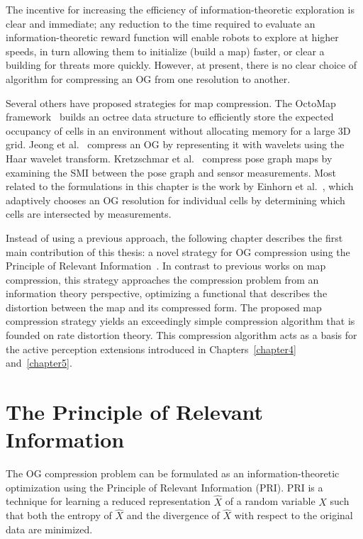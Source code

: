 The incentive for increasing the efficiency of information-theoretic exploration
is clear and immediate; any reduction to the time required to evaluate an
information-theoretic reward function will enable robots to explore at higher
speeds, in turn allowing them to initialize (build a map) faster, or clear a
building for threats more quickly. However, at present, there is no clear choice
of algorithm for compressing an OG from one resolution to another.

Several others have proposed strategies for map compression. The OctoMap
framework~\cite{wurm2010octomap} builds an octree data structure to efficiently store the
expected occupancy of cells in an environment without allocating memory for a
large 3D grid. Jeong et al.~\cite{im2010real} compress an OG by representing it with
wavelets using the Haar wavelet transform. Kretzschmar et
al.~\cite{kretzschmar2012information} compress
pose graph maps by examining the SMI between the pose
graph and sensor measurements. Most related to the formulations in this chapter is the
work by Einhorn et al.~\cite{einhorn2011finding}, which adaptively chooses an OG resolution for
individual cells by determining which cells are intersected by measurements.

Instead of using a previous approach, the following chapter describes the first main contribution of this
thesis: a novel strategy for OG compression using the Principle of Relevant
Information~\cite{principe2010information}. In contrast to previous works on map
compression, this strategy approaches the compression problem from an information theory
perspective, optimizing a functional that describes the distortion between the
map and its compressed form. The proposed map compression strategy yields an
exceedingly simple compression algorithm that is founded on rate
distortion theory. This compression algorithm acts as a basis for the
active perception extensions introduced in Chapters~\ref{chapter4} and~\ref{chapter5}.

\section{The Principle of Relevant Information}

The OG compression problem can be formulated as an information-theoretic optimization
using the Principle of Relevant Information (PRI). PRI is a technique for learning a
reduced representation $\hat{X}$ of a random variable $X$ such that both the entropy of
$\hat{X}$ and the divergence of $\hat{X}$ with respect to the original data are minimized.
%

